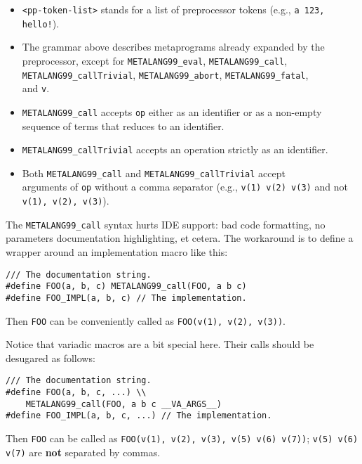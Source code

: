 \documentclass[12pt]{article}
\theoremstyle{break}
\begin{document}
\begin{itemize}
    \item \texttt{<pp-token-list>} stands for a list of preprocessor tokens (e.g., \texttt{a 123, hello!}).
    \item The grammar above describes metaprograms already expanded by the preprocessor,
    except for \texttt{METALANG99\_eval}, \texttt{METALANG99\_call},\\\texttt{METALANG99\_callTrivial},
    \texttt{METALANG99\_abort}, \texttt{METALANG99\_fatal},\\and \texttt{v}.
    \item \texttt{METALANG99\_call} accepts \texttt{op} either as an identifier or as a non-empty
    sequence of terms that reduces to an identifier.
    \item \texttt{METALANG99\_callTrivial} accepts an operation strictly as an identifier.
    \item Both \texttt{METALANG99\_call} and \texttt{METALANG99\_callTrivial} accept \\ arguments of \texttt{op}
    without a comma separator (e.g., \texttt{v(1) v(2) v(3)} and not \texttt{v(1), v(2), v(3)}).
\end{itemize}

The \texttt{METALANG99\_call} syntax hurts IDE support: bad code formatting, no parameters
documentation highlighting, et cetera. The workaround is to define a wrapper around
an implementation macro like this:

\begin{verbatim}
/// The documentation string.
#define FOO(a, b, c) METALANG99_call(FOO, a b c)
#define FOO_IMPL(a, b, c) // The implementation.
\end{verbatim}

Then \texttt{FOO} can be conveniently called as \texttt{FOO(v(1), v(2), v(3))}.

Notice that variadic macros are a bit special here. Their calls should be desugared as follows:

\begin{verbatim}
/// The documentation string.
#define FOO(a, b, c, ...) \\
    METALANG99_call(FOO, a b c __VA_ARGS__)
#define FOO_IMPL(a, b, c, ...) // The implementation.
\end{verbatim}

Then \texttt{FOO} can be called as \texttt{FOO(v(1), v(2), v(3), v(5) v(6) v(7))};
\texttt{v(5) v(6) v(7)} are \textbf{not} separated by commas.
\end{document}
